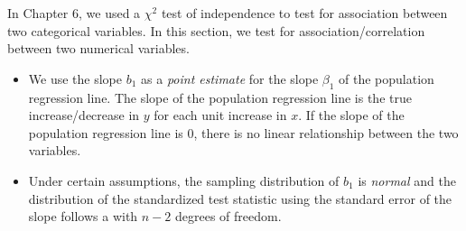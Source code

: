 \noindent In Chapter 6, we used a $\chi^2$ test of independence to test for association between two categorical variables.  In this section, we test for association/correlation between two numerical variables.
\begin{itemize}
\item We use the slope $b_1$ as a \emph{point estimate} for the slope $\beta_1$ of the population regression line.  The slope of the population regression line is the true increase/decrease in $y$ for each unit increase in $x$.  If the slope of the population regression line is 0, there is no linear relationship between the two variables.  
\item Under certain assumptions, the sampling distribution of $b_1$ is \emph{normal} and the distribution of the standardized test statistic using the standard error of the slope follows a  with $n-2$ degrees of freedom.


\end{itemize}
